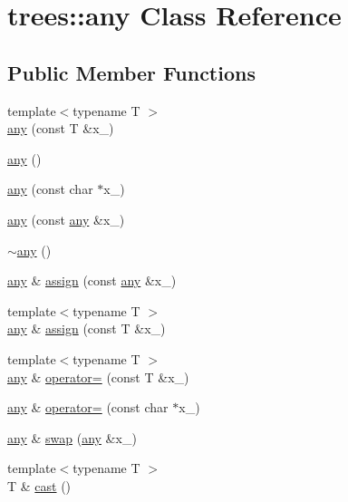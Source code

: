 \hypertarget{classtrees_1_1any}{}\section{trees\+:\+:any Class Reference}
\label{classtrees_1_1any}
\subsection*{Public Member Functions}
\begin{DoxyCompactItemize}
\item 
{\footnotesize template$<$typename T $>$ }\\\hyperlink{classtrees_1_1any_aff96b0dcecc2856f268f4da58b0e6e8c}{any} (const T \&x\+\_\+)
\item 
\hyperlink{classtrees_1_1any_a1427bfdf982490592ad0589bd16e9873}{any} ()
\item 
\hyperlink{classtrees_1_1any_ad788f1e315b3c165066da62204e897d5}{any} (const char $\ast$x\+\_\+)
\item 
\hyperlink{classtrees_1_1any_a4bf7cafb65d0ac435cd955eed3c63d40}{any} (const \hyperlink{classtrees_1_1any}{any} \&x\+\_\+)
\item 
\hyperlink{classtrees_1_1any_a868cb1536d483870e821cfb0951081ba}{$\sim$any} ()
\item 
\hyperlink{classtrees_1_1any}{any} \& \hyperlink{classtrees_1_1any_a25ef43f8c96240c237e972acaae51cba}{assign} (const \hyperlink{classtrees_1_1any}{any} \&x\+\_\+)
\item 
{\footnotesize template$<$typename T $>$ }\\\hyperlink{classtrees_1_1any}{any} \& \hyperlink{classtrees_1_1any_ae4cad6b85b6f7810d750fccc500a11c9}{assign} (const T \&x\+\_\+)
\item 
{\footnotesize template$<$typename T $>$ }\\\hyperlink{classtrees_1_1any}{any} \& \hyperlink{classtrees_1_1any_a140baa23d88a29f302311907770efdb4}{operator=} (const T \&x\+\_\+)
\item 
\hyperlink{classtrees_1_1any}{any} \& \hyperlink{classtrees_1_1any_ad9257bc866836a44234475cba8db09c2}{operator=} (const char $\ast$x\+\_\+)
\item 
\hyperlink{classtrees_1_1any}{any} \& \hyperlink{classtrees_1_1any_ae40e8edda441ea943aac7f6a0f46edf0}{swap} (\hyperlink{classtrees_1_1any}{any} \&x\+\_\+)
\item 
{\footnotesize template$<$typename T $>$ }\\T \& \hyperlink{classtrees_1_1any_afc8d23b68e666ef86664459a69255cfc}{cast} ()

\end{DoxyCompactItemize}
